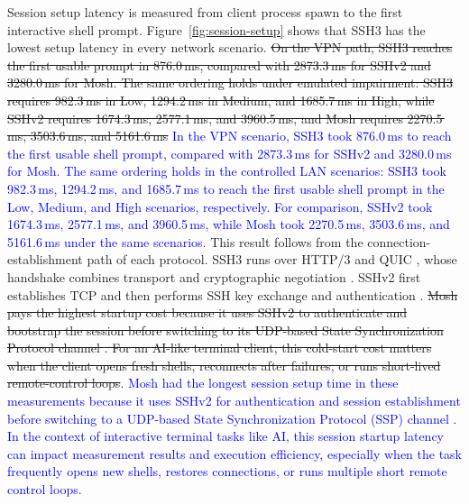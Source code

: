 Session setup latency is measured from client process spawn to the first interactive shell prompt. Figure~\ref{fig:session-setup} shows that SSH3 has the lowest setup latency in every network scenario. \sout{On the VPN path, SSH3 reaches the first usable prompt in 876.0\,ms, compared with 2873.3\,ms for SSHv2 and 3280.0\,ms for Mosh. The same ordering holds under emulated impairment: SSH3 requires 982.3\,ms in Low, 1294.2\,ms in Medium, and 1685.7\,ms in High, while SSHv2 requires 1674.3\,ms, 2577.1\,ms, and 3960.5\,ms, and Mosh requires 2270.5\,ms, 3503.6\,ms, and 5161.6\,ms} \textcolor{blue}{In the VPN scenario, SSH3 took 876.0\,ms to reach the first usable shell prompt, compared with 2873.3\,ms for SSHv2 and 3280.0\,ms for Mosh. The same ordering holds in the controlled LAN scenarios: SSH3 took 982.3\,ms, 1294.2\,ms, and 1685.7\,ms to reach the first usable shell prompt in the Low, Medium, and High scenarios, respectively. For comparison, SSHv2 took 1674.3\,ms, 2577.1\,ms, and 3960.5\,ms, while Mosh took 2270.5\,ms, 3503.6\,ms, and 5161.6\,ms under the same scenarios}. This result follows from the connection-establishment path of each protocol. SSH3 runs over HTTP/3 and QUIC \cite{michel2023}, whose handshake combines transport and cryptographic negotiation \cite{Iyengar2021}. SSHv2 first establishes TCP and then performs SSH key exchange and authentication \cite{Ylonen2006RFC4253}. \sout{Mosh pays the highest startup cost because it uses SSHv2 to authenticate and bootstrap the session before switching to its UDP-based State Synchronization Protocol channel \cite{Winstein2012}. For an AI-like terminal client, this cold-start cost matters when the client opens fresh shells, reconnects after failures, or runs short-lived remote-control loops}. \textcolor{blue}{Mosh had the longest session setup time in these measurements because it uses SSHv2 for authentication and session establishment before switching to a UDP-based State Synchronization Protocol (SSP) channel \cite{Winstein2012}. In the context of interactive terminal tasks like AI, this session startup latency can impact measurement results and execution efficiency, especially when the task frequently opens new shells, restores connections, or runs multiple short remote control loops}.

